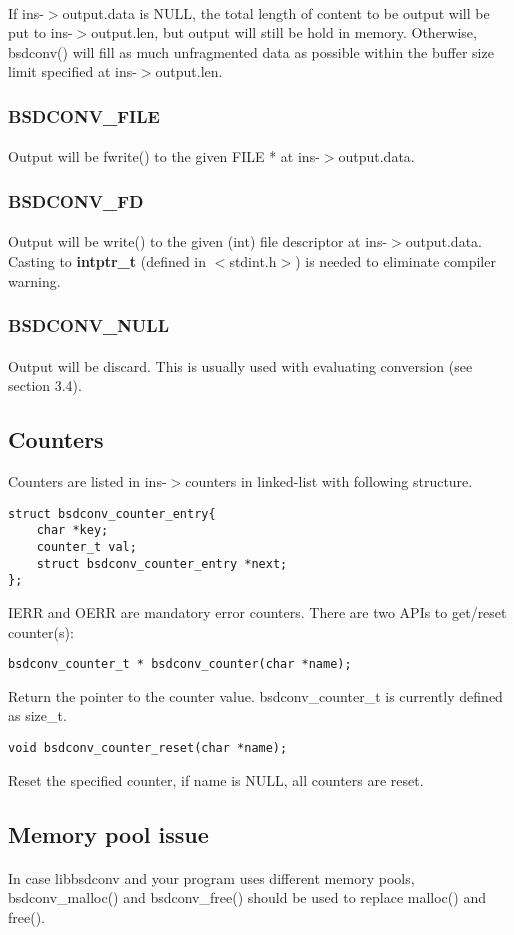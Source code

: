 \documentclass{article}
\begin{document}
				\paragraph{}
				If ins-$>$output.data is NULL, the total length of content to be output will be put to ins-$>$output.len, but output will still be hold in memory. Otherwise, bsdconv() will fill as much unfragmented data as possible within the buffer size limit specified at ins-$>$output.len.
			\subsubsection{BSDCONV\_FILE}
				\paragraph{}
				Output will be fwrite() to the given FILE * at ins-$>$output.data.
			\subsubsection{BSDCONV\_FD}
				\paragraph{}
				Output will be write() to the given (int) file descriptor at ins-$>$output.data. Casting to \textbf{intptr\_t} (defined in $<$stdint.h$>$) is needed to eliminate compiler warning.
			\subsubsection{BSDCONV\_NULL}
				\paragraph{}
				Output will be discard. This is usually used with evaluating conversion (see section 3.4).

		\subsection{Counters}
			Counters are listed in ins-$>$counters in linked-list with following structure.
			\begin{lstlisting}
struct bsdconv_counter_entry{
	char *key;
	counter_t val;
	struct bsdconv_counter_entry *next;
};
			\end{lstlisting}
			IERR and OERR are mandatory error counters.
			\newpage\noindent
			There are two APIs to get/reset counter(s):
			\begin{lstlisting}
bsdconv_counter_t * bsdconv_counter(char *name);
			\end{lstlisting}
			Return the pointer to the counter value. bsdconv\_counter\_t is currently defined as size\_t.
			\begin{lstlisting}
void bsdconv_counter_reset(char *name);
			\end{lstlisting}
			Reset the specified counter, if name is NULL, all counters are reset.
		\subsection{Memory pool issue}
			\paragraph{}
			In case libbsdconv and your program uses different memory pools, bsdconv\_malloc() and bsdconv\_free() should be used to replace malloc() and free().
\end{document}
